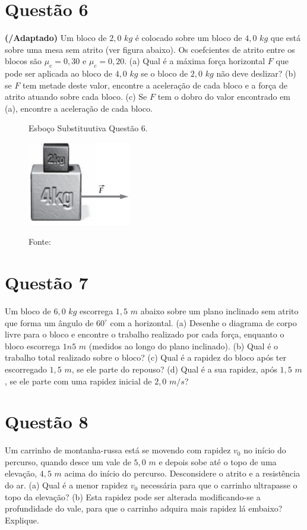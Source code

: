 \section*{Questão 6}

\textbf{(\cite{TiplerMosca2006}/Adaptado)} Um bloco de $2,0$ $kg$ é colocado sobre um bloco de $4,0$ $kg$ que está sobre uma mesa sem atrito (ver figura abaixo). Os coefcientes de  atrito entre os blocos são ${\mu}_e = 0,30$ e ${\mu}_c = 0,20$. (a) Qual é a máxima força horizontal $F$ que pode ser aplicada ao bloco de $4,0$ $kg$ se o bloco de $2,0$ $kg$ não deve deslizar? (b) se $F$ tem metade deste valor, encontre a aceleração de cada bloco e a força de atrito atuando sobre cada bloco. (c) Se $F$ tem o dobro do valor encontrado em (a), encontre a aceleração de cada bloco.

\begin{figure}[ht]
\begin{center}
\caption*{Esboço Substituutiva Questão 6.}
\includegraphics[width=0.4\textwidth]{fig/orp1s6.png}
\label{fig:ORP1s6}
\caption*{Fonte: }
\end{center}
\end{figure}

\section*{Questão 7}

\textbf{\cite{TiplerMosca2006}} Um bloco de $6,0$ $kg$ escorrega $1,5$ $m$ abaixo sobre um plano inclinado sem atrito que forma um ângulo de $60^{\circ}$ com a horizontal. (a) Desenhe o diagrama de corpo livre para o bloco e encontre o trabalho realizado por cada força, enquanto o bloco escorrega $1n5$ $m$ (medidos ao longo do plano inclinado). (b) Qual é o trabalho total realizado sobre o bloco? (c) Qual é a rapidez do bloco após ter escorregado $1,5$ $m$, se ele parte do repouso? (d) Qual é a sua rapidez, após $1,5$ $m$, se ele parte com uma rapidez inicial de $2,0$ $m/s$?

\section*{Questão 8}

\textbf{\cite{TiplerMosca2006}} Um carrinho de montanha-russa está se movendo com rapidez $v_0$ no início do percurso, quando desce um vale de $5,0$ $m$ e depois sobe até o topo de uma elevação, $4,5$ $m$ acima do início do percurso. Desconsidere o atrito e a resistência do ar. (a) Qual é a menor rapidez $v_0$ necessária para que o carrinho ultrapasse o topo da elevação? (b) Esta rapidez pode ser alterada modificando-se a profundidade do vale, para que o carrinho adquira mais rapidez lá embaixo? Explique.